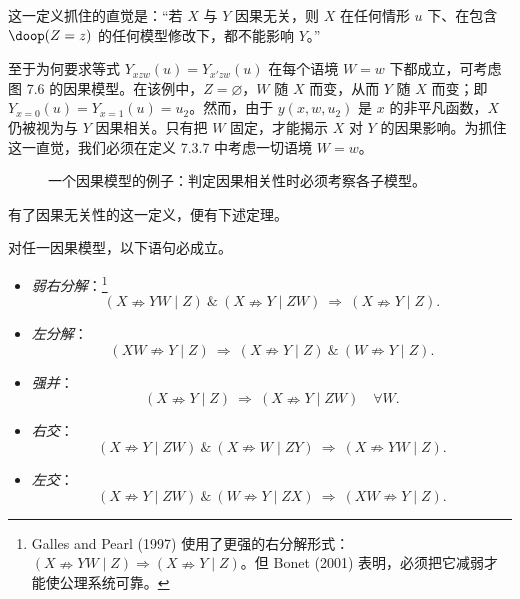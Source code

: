 这一定义抓住的直觉是：“若 $X$ 与 $Y$ 因果无关，则 $X$ 在任何情形 $u$ 下、在包含 $\doop(Z=z)$ 的任何模型修改下，都不能影响 $Y$。”

至于为何要求等式 $Y_{xzw}(u)=Y_{x'zw}(u)$ 在每个语境 $W=w$ 下都成立，可考虑图 7.6 的因果模型。在该例中，$Z=\varnothing$，$W$ 随 $X$ 而变，从而 $Y$ 随 $X$ 而变；即 $Y_{x=0}(u)=Y_{x=1}(u)=u_2$。然而，由于 $y(x,w,u_2)$ 是 $x$ 的非平凡函数，$X$ 仍被视为与 $Y$ 因果相关。只有把 $W$ 固定，才能揭示 $X$ 对 $Y$ 的因果影响。为抓住这一直觉，我们必须在定义 7.3.7 中考虑一切语境 $W=w$。

\begin{figure}[htbp]
\centering
{}
\renewcommand{\thefigure}{7.6}
\caption{一个因果模型的例子：判定因果相关性时必须考察各子模型。}
\end{figure}

有了因果无关性的这一定义，便有下述定理。

\begin{theorem}
对任一因果模型，以下语句必成立。
\begin{itemize}[leftmargin=2.4em,itemsep=0.35em]
\item \emph{弱右分解}：\footnote{Galles and Pearl (1997) 使用了更强的右分解形式：$(X\nRightarrow YW\mid Z)\Rightarrow(X\nRightarrow Y\mid Z)$。但 Bonet (2001) 表明，必须把它减弱才能使公理系统可靠。}
\[
(X\nRightarrow YW\mid Z)\ \&\ (X\nRightarrow Y\mid ZW)\ \Longrightarrow\ (X\nRightarrow Y\mid Z).
\]
\item \emph{左分解}：
\[
(XW\nRightarrow Y\mid Z)\ \Longrightarrow\ (X\nRightarrow Y\mid Z)\ \&\ (W\nRightarrow Y\mid Z).
\]
\item \emph{强并}：
\[
(X\nRightarrow Y\mid Z)\ \Longrightarrow\ (X\nRightarrow Y\mid ZW)\quad\forall W.
\]
\item \emph{右交}：
\[
(X\nRightarrow Y\mid ZW)\ \&\ (X\nRightarrow W\mid ZY)\ \Longrightarrow\ (X\nRightarrow YW\mid Z).
\]
\item \emph{左交}：
\[
(X\nRightarrow Y\mid ZW)\ \&\ (W\nRightarrow Y\mid ZX)\ \Longrightarrow\ (XW\nRightarrow Y\mid Z).
\]
\end{itemize}
\end{theorem}

